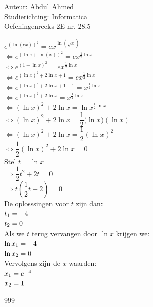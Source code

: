 \documentclass[a4paper]{article}
\begin{document}
  
\noindent \large Auteur: Abdul Ahmed \\
\noindent \large Studierichting: Informatica\\
\noindent \large Oefeningenreeks 2E nr. 28.5 \\

\medskip

\normalsize

$ e^{(\ln(ex))^2} = ex^{\ln(\sqrt{x})}$\\

$ \Leftrightarrow e^{(\ln e + \ln(x))^2} = ex^{\tfrac{1}{2}\ln x}$\\

$ \Leftrightarrow e^{(1 + \ln x)^2} = ex^{\tfrac{1}{2}\ln x}$\\

$ \Leftrightarrow e^{(\ln x)^2+2\ln x+ 1} = ex^{\tfrac{1}{2}\ln x}$\\

$ \Leftrightarrow e^{(\ln x)^2+2\ln x +1 - 1} = x^{\tfrac{1}{2}\ln x}$\\

$ \Leftrightarrow e^{(\ln x)^2+2\ln x} = x^{\tfrac{1}{2}\ln x}$\\

$ \Leftrightarrow (\ln x)^2+2\ln x = \ln x{^{\tfrac{1}{2}\ln x}}$\\

$ \Leftrightarrow (\ln x)^2+2\ln x = {\dfrac{1}{2}(\ln x})(\ln x)$\\

$ \Leftrightarrow (\ln x)^2+2\ln x = \dfrac{1}{2}(\ln x)^2$\\

$ \Leftrightarrow \dfrac{1}{2}(\ln x)^2 + 2\ln x = 0$\\

Stel $t = \ln x$\\

$ \Rightarrow \dfrac{1}{2}t^2 + 2t = 0$\\

$ \Rightarrow t(\dfrac{1}{2}t + 2) = 0$\\

De oplosssingen voor $t$ zijn dan: \\

$ t\textsubscript{1} = -4$ \\

$ t\textsubscript{2} = 0$ \\

Als we $t$ terug vervangen door $\ln x$ krijgen we: \\

$ \ln x\textsubscript{1} = -4$ \\

$ \ln x\textsubscript{2} = 0$ \\


Vervolgens zijn de $x$-waarden: \\

$ x\textsubscript{1} = e^{-4}$ \\

$ x\textsubscript{2} = 1 $\\

\begin{thebibliography}{999}
\end{thebibliography}
\end{document}
